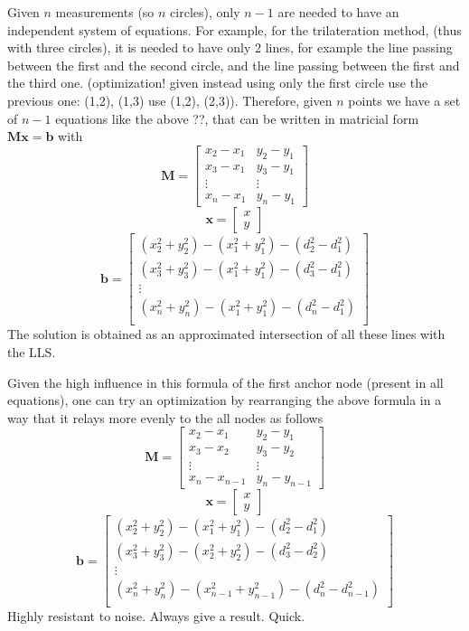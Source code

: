 \documentclass[12pt]{report}
\begin{document}
Given $n$ measurements (so $n$ circles), only $n-1$ are needed to have an independent system of equations. For example, for the trilateration method, (thus with three circles), it is needed to have only 2 lines, for example the line passing between the first and the second circle, and the line passing between the first and the third one. (optimization! given instead using only the first circle use the previous one: (1,2), (1,3) use (1,2), (2,3)).
Therefore, given $n$ points we have a set of $n-1$ equations like the above ??, that can be written in matricial form $\mathbf{Mx}=\mathbf{b}$ with
$$\mathbf{M}=\begin{bmatrix}
x_2-x_1&y_2-y_1\\
x_3-x_1&y_3-y_1\\
\vdots&\vdots\\
x_n-x_1&y_n-y_1
\end{bmatrix}$$
$$\mathbf{x}=\begin{bmatrix}
x\\
y
\end{bmatrix}$$
$$\mathbf{b}=\begin{bmatrix}
(x^2_2+y^2_2)-(x_1^2+y^2_1)-(d_2^2-d_1^2)\\
(x^2_3+y^2_3)-(x_1^2+y^2_1)-(d_3^2-d_1^2)\\
\vdots\\
(x^2_n+y^2_n)-(x_1^2+y^2_1)-(d_n^2-d_1^2)\\
\end{bmatrix}$$
The solution is obtained as an approximated intersection of all these lines with the LLS.

Given the high influence in this formula of the first anchor node (present in all equations), one can try an optimization by rearranging the above formula in a way that it relays more evenly to the all nodes as follows
$$\mathbf{M}=\begin{bmatrix}
x_2-x_1&y_2-y_1\\
x_3-x_2&y_3-y_2\\
\vdots&\vdots\\
x_n-x_{n-1}&y_n-y_{n-1}
\end{bmatrix}$$
$$\mathbf{x}=\begin{bmatrix}
x\\
y
\end{bmatrix}$$
$$\mathbf{b}=\begin{bmatrix}
(x^2_2+y^2_2)-(x_1^2+y^2_1)-(d_2^2-d_1^2)\\
(x^2_3+y^2_3)-(x_2^2+y^2_2)-(d_3^2-d_2^2)\\
\vdots\\
(x^2_n+y^2_n)-(x_{n-1}^2+y^2_{n-1})-(d_n^2-d_{n-1}^2)\\
\end{bmatrix}$$
Highly resistant to noise. Always give a result. Quick.
\clearpage
\end{document}
